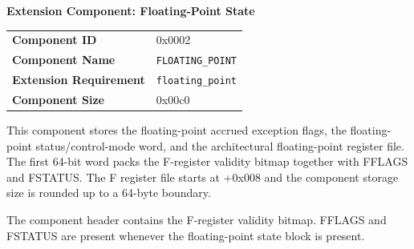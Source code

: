 \documentclass[10pt,twoside]{article}
\begin{document}
\par\smallskip\Needspace{2.4in}
\noindent\textbf{Extension Component: Floating-Point State}\par\smallskip
\begingroup\footnotesize
\begin{tabularx}{0.985\linewidth}{@{}p{1.35in}X@{}}
\textbf{Component ID} & 0x0002\\
\textbf{Component Name} & \texttt{FLOATING\_POINT}\\
\textbf{Extension Requirement} & \texttt{floating\_point}\\
\textbf{Component Size} & 0x00c0\\
\end{tabularx}\endgroup\par\smallskip
\noindent This component stores the floating-point accrued exception flags, the floating-point status/control-mode word, and the architectural floating-point register file. The first 64-bit word packs the F-register validity bitmap together with FFLAGS and FSTATUS. The F register file starts at +0x008 and the component storage size is rounded up to a 64-byte boundary.\par\smallskip
\noindent The component header contains the F-register validity bitmap. FFLAGS and FSTATUS are present whenever the floating-point state block is present.\par\smallskip
\Needspace{4.48in}
\end{document}
